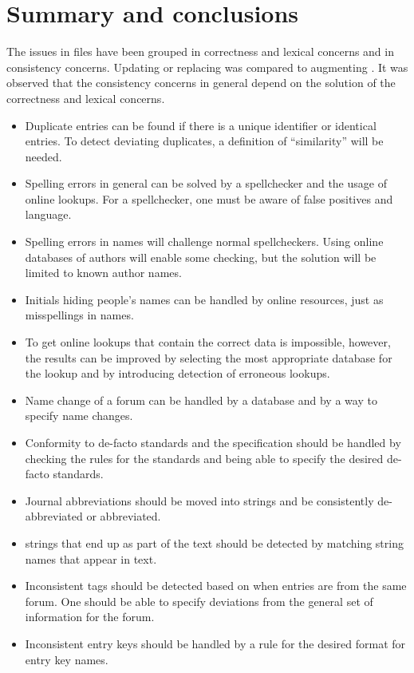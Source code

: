 \section{Summary and conclusions}

The issues in {\bibtex} files have been grouped in correctness and
lexical concerns and in consistency concerns.  Updating or replacing
{\bibtex} was compared to augmenting {\bibtex}.  It was observed that
the consistency concerns in general depend on the solution of the
correctness and lexical concerns.

\begin{itemize}
\item Duplicate entries can be found if there is a unique identifier
  or identical entries.  To detect deviating duplicates, a definition
  of ``similarity'' will be needed.

\item Spelling errors in general can be solved by a spellchecker and
  the usage of online lookups.  For a spellchecker, one must be aware
  of false positives and language.

\item Spelling errors in names will challenge normal spellcheckers.
  Using online databases of authors will enable some checking, but the
  solution will be limited to known author names.

\item Initials hiding people's names can be handled by online
  resources, just as misspellings in names.

\item To get online lookups that contain the correct data is
  impossible, however, the results can be improved by selecting the
  most appropriate database for the lookup and by introducing
  detection of erroneous lookups.

\item Name change of a forum can be handled by a database and by a way
  to specify name changes.

\item Conformity to de-facto standards and the {\bibtex} specification
  should be handled by checking the rules for the standards and being
  able to specify the desired de-facto standards.

\item Journal abbreviations should be moved into strings and be
  consistently de-abbreviated or abbreviated.

\item {\bibtex} strings that end up as part of the text should be
  detected by matching string names that appear in text.

\item Inconsistent tags should be detected based on when entries are
  from the same forum.  One should be able to specify deviations from
  the general set of information for the forum.

\item Inconsistent entry keys should be handled by a rule for the
  desired format for entry key names.
\end{itemize}

